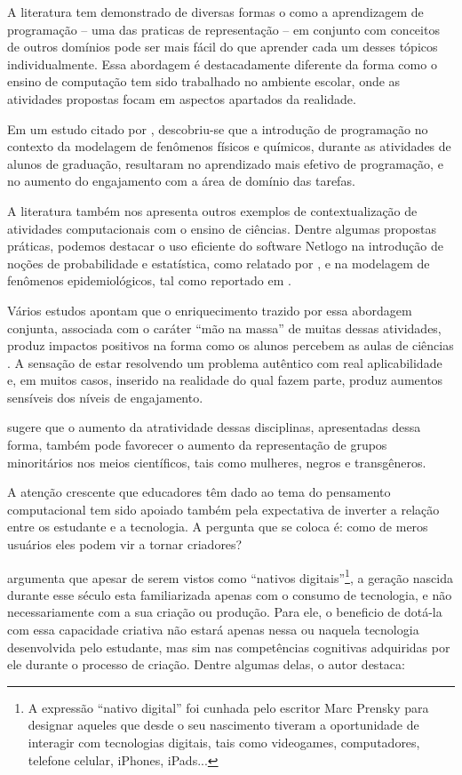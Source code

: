 A literatura tem demonstrado de diversas formas o como a aprendizagem de programação -- uma das praticas de representação -- em conjunto com conceitos de outros domínios pode ser mais fácil do que aprender cada um desses tópicos individualmente. Essa abordagem é destacadamente diferente da forma como o ensino de computação tem sido trabalhado no ambiente escolar, onde as atividades propostas focam em aspectos apartados da realidade.

Em um estudo citado por , descobriu-se que a introdução de programação no contexto da modelagem de fenômenos físicos e químicos, durante as atividades de alunos de graduação, resultaram no aprendizado mais efetivo de programação, e no aumento do engajamento com a área de domínio das tarefas.

A literatura também nos apresenta outros exemplos de contextualização de atividades computacionais com o ensino de ciências. Dentre algumas propostas práticas, podemos destacar o uso eficiente do software Netlogo \cite{netlogo} na introdução de noções de probabilidade e estatística, como relatado por , e na modelagem de fenômenos epidemiológicos, tal como reportado em \cite{Lee2011}.

Vários estudos apontam que o enriquecimento trazido por essa abordagem conjunta, associada com o caráter ``mão na massa'' de muitas dessas atividades, produz impactos positivos na forma como os alunos percebem as aulas de ciências \cite{Lee2011, Barr2011}. A sensação de estar resolvendo um problema autêntico com real aplicabilidade e, em muitos casos, inserido na realidade do qual fazem parte, produz aumentos sensíveis dos níveis de engajamento.

 sugere que o aumento da atratividade dessas disciplinas, apresentadas dessa forma, também pode favorecer o aumento da representação de grupos minoritários nos meios científicos, tais como mulheres, negros e transgêneros.

A atenção crescente que educadores têm dado ao tema do pensamento computacional tem sido apoiado também pela expectativa de inverter a relação entre os estudante e a tecnologia. A pergunta que se coloca é: como de meros usuários eles podem vir a tornar criadores? 

 argumenta que apesar de serem vistos como ``nativos digitais''\footnote{A expressão ``nativo digital'' foi cunhada pelo escritor Marc Prensky para designar aqueles que desde o seu nascimento tiveram a oportunidade de interagir com tecnologias digitais, tais como videogames, computadores, telefone celular, iPhones, iPads...},  a geração nascida durante esse século esta familiarizada apenas com o consumo de tecnologia, e não necessariamente com a sua criação ou produção. Para ele, o beneficio de dotá-la com essa capacidade criativa não estará apenas nessa ou naquela tecnologia desenvolvida pelo estudante, mas sim nas competências cognitivas adquiridas por ele durante o processo de criação. Dentre algumas delas, o autor destaca:

